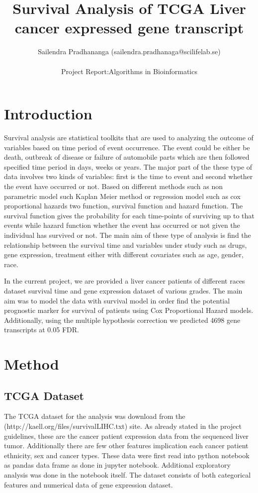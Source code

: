 \documentclass[11pt]{article}
\title{Survival Analysis of TCGA Liver cancer expressed gene transcript }
\author{ Sailendra Pradhananga (sailendra.pradhanaga@scilifelab.se)\\ \\
			Project Report:Algorithms in Bioinformatics}
\begin{document}
\maketitle

\section{Introduction}


Survival analysis are statistical toolkits that are used to analyzing the outcome of variables based on time period of event occurrence. The event could be either be death, outbreak of disease or failure of automobile parts which are then followed specified time period in days, weeks or years. The major part of the these type of data involves two kinds of variables: first is the time to event and second whether the event have occurred or not. Based on different methods such as non parametric model such Kaplan Meier method or regression model such as cox proportional hazards two function, survival function and hazard function. The survival function gives the probability  for each time-points of surviving up to that events while hazard function whether the event has occurred or not  given the individual has survived or not. The main aim of these type of analysis is find the relationship between the survival time and variables under study such as drugs, gene expression, treatment  either with different covariates such as age, gender, race.

In the current project, we are provided a liver cancer patients of different races  dataset survival time and gene expression dataset of various grades. The main aim was to model the data with survival model in order find the potential prognostic marker for survival of patients using Cox Proportional Hazard models. Additionally, using the multiple hypothesis correction we predicted 4698 gene transcripts at 0.05 FDR. 

\section{Method}

	\subsection{TCGA Dataset}
The  TCGA dataset for the analysis was download from the (http://kaell.org/files/survivalLIHC.txt) site. As already stated in the project guidelines, these are the cancer patient expression data from the sequenced liver tumor.  Additionally there are few other features implication each cancer patient ethnicity, sex and cancer types.  These data were first read into python notebook as pandas data frame  as done in  jupyter notebook.  Additional exploratory analysis was done in the notebook itself. The  dataset consists of both categorical features and numerical data of gene expression dataset. 
\end{document}
